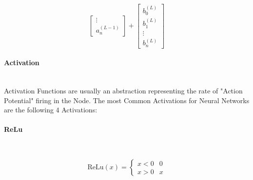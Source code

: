 \begin{flushleft}
\begin{center}
\[\begin{bmatrix}
                        \vdots      \\
                        a^{(L-1)}_{n} 
                        \end{bmatrix}
                        +
                        \begin{bmatrix}
                        b^{(L)}_{0} \\
                        b^{(L)}_{1} \\
                        \vdots      \\
                        b^{(L)}_{n} 
                        \end{bmatrix}
                        \]
                    \end{center}
                    \vspace{0.2cm}

                \paragraph{Activation} \mbox{} \\
                    \vspace{0.2cm}
                    Activation Functions are usually an abstraction representing the rate of "Action Potential" firing in the Node.
                    The most Common Activations for Neural Networks are the following 4 Activations: \\
                \paragraph{ReLu} \mbox{} \\
                    \begin{center}
                        \[
                            \text{ReLu}(x) =  \begin{cases}
                                                x < 0 & 0 \\
                                                x > 0 & x
                                                \end{cases}
                        \]
                        
                        \vspace{0.2cm}
                    \end{center}
 

\end{flushleft}
